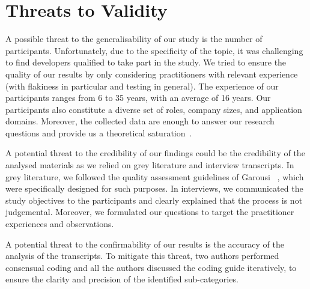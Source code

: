 \section{Threats to Validity}
\label{sec:survey-threats}

A possible threat to the generalisability of our study is the number of participants. Unfortunately, %
due to the specificity of the topic, it was challenging to find developers qualified to take part in the study. We tried to ensure the quality of our results by only considering practitioners with relevant experience (with flakiness in particular and testing in general). The experience of our participants ranges from 6 to 35 years, with an average of 16 years.
Our participants also constitute a diverse set of roles, company sizes, and application domains.
Moreover, %
the collected data are enough to answer our research questions and provide us a theoretical saturation~\cite{glaser2007remodeling}.




A potential threat to the credibility of our findings could be the credibility of the analysed materials as we relied on grey literature and interview transcripts.
In grey literature, we followed the quality assessment guidelines of Garousi \etal~\cite{garousi2019guidelines}, which were specifically designed for such purposes.
In interviews, we communicated the study objectives to the participants and clearly explained that the process is not judgemental.
Moreover, we formulated our questions to target the practitioner experiences and observations.%




A potential threat to the confirmability of our results is the accuracy of the analysis of the transcripts.
To mitigate this threat, two authors performed consensual coding and all the authors discussed the coding guide iteratively, to ensure the clarity and precision of the identified sub-categories.
